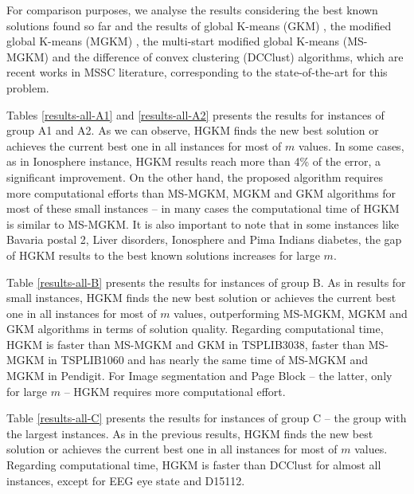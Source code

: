 For comparison purposes, we analyse the results considering the best known solutions found so far and the results of global K-means (GKM) \cite{Likas2003}, the modified global K-means (MGKM) \cite{Bagirov2008}, the multi-start modified global K-means (MS-MGKM) \cite{Ordin2014} and the difference of convex clustering (DCClust) \cite{Bagirov2016} algorithms, which are recent works in MSSC literature, corresponding to the state-of-the-art for this problem.

Tables \ref{results-all-A1} and \ref{results-all-A2} presents the results for instances of group A1 and A2. As we can observe, HGKM finds the new best solution or achieves the current best one in all instances for most of $m$ values. In some cases, as in Ionosphere instance, HGKM results reach more than 4\% of the error, a significant improvement. On the other hand, the proposed algorithm requires more computational efforts than MS-MGKM, MGKM and GKM algorithms for most of these small instances -- in many cases the computational time of HGKM is similar to MS-MGKM. It is also important to note that in some instances like Bavaria postal 2, Liver disorders, Ionosphere and Pima Indians diabetes, the gap of HGKM results to the best known solutions increases for large $m$.

Table \ref{results-all-B} presents the results for instances of group B. As in results for small instances, HGKM finds the new best solution or achieves the current best one in all instances for most of $m$ values, outperforming MS-MGKM, MGKM and GKM algorithms in terms of solution quality. Regarding computational time, HGKM is faster than MS-MGKM and GKM in TSPLIB3038, faster than MS-MGKM in TSPLIB1060 and has nearly the same time of MS-MGKM and MGKM in Pendigit. For Image segmentation and Page Block -- the latter, only for large $m$ -- HGKM requires more computational effort.

Table \ref{results-all-C} presents the results for instances of group C -- the group with the largest instances. As in the previous results, HGKM finds the new best solution or achieves the current best one in all instances for most of $m$ values. Regarding computational time, HGKM is faster than DCClust for almost all instances, except for EEG eye state and D15112.










